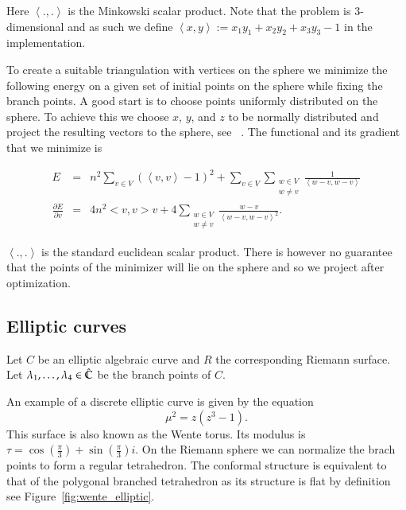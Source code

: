 \documentclass[Thesis.tex]{subfiles}
\begin{document}
Here $\left<.,.\right>$ is the Minkowski scalar product. Note that the problem is
 $3$-dimensional and as such we define $\left<x,y\right>:=x_1y_1+x_2y_2+x_3y_3-1$ in
the implementation.


To create a suitable triangulation with vertices on the sphere we minimize the following energy on a given set of initial points on the sphere while fixing the branch points. 
A good start is to choose points uniformly distributed on the sphere. 
To achieve this we choose $x$, $y$, and $z$ to be normally distributed and project the resulting vectors to the sphere, see~ \cite{Muller1959}. 
The functional and its gradient that we minimize is

\begin{eqnarray*}
	E &=& n^2\sum_{v\in V}\left( \left<v,v\right> - 1\right)^2 + \sum_{v\in
V}\sum_{\substack{w\in V\\w\neq v}} \frac{1}{\left<w-v, w-v\right>}\\ \frac{\partial
E}{\partial v} &=& 4n^2<v,v>v + 4\sum_{\substack{w\in V\\w\neq
v}}\frac{w-v}{\left<w-v,w-v\right>^2}.  \end{eqnarray*}

$\left<.,.\right>$ is the standard euclidean scalar product. There is however no guarantee that the points of the minimizer will lie on the sphere and so we project after optimization.


\subsection{Elliptic curves}
\label{sec:examples_elliptic}

Let $C$ be an elliptic algebraic curve and $R$ the corresponding Riemann
surface. Let $\lambda_1, \ldots, \lambda_4 \in \hat{\mathbb C}$ be the branch points of
$C$. 

\begin{example}
\label{ex:wente_elliptic}
An example of a discrete elliptic curve is given by the equation
\begin{equation} \mu^2=z(z^3-1).  \end{equation} This surface is also known as
the Wente torus. Its modulus is
$\tau=\cos(\frac{\pi}{3})+\sin(\frac{\pi}{3})i$. On the Riemann sphere we can
normalize the brach points to form a regular tetrahedron. The conformal
structure is equivalent to that of the polygonal branched tetrahedron as its
structure is flat by definition see Figure~\ref{fig:wente_elliptic}.
\end{example}
\end{document}
